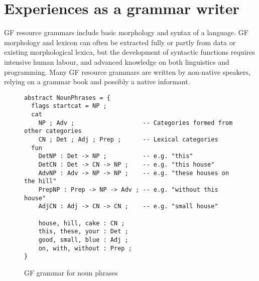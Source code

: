 \documentclass[11pt]{article}
\begin{document}
\section{Experiences as a grammar writer}


GF resource grammars include basic morphology and syntax of a language. GF morphology and lexicon can often be extracted fully or partly from data or existing morphological lexica, but the development of syntactic functions requires intensive human labour, and advanced knowledge on both linguistics and programming.
Many GF resource grammars are written by non-native speakers, relying on a grammar book and possibly a native informant.






\begin{figure}[h]
  \centering
    \begin{verbatim}
abstract NounPhrases = {
  flags startcat = NP ;
  cat
    NP ; Adv ;                   -- Categories formed from other categories
    CN ; Det ; Adj ; Prep ;      -- Lexical categories
  fun
    DetNP : Det -> NP ;          -- e.g. "this"
    DetCN : Det -> CN -> NP ;    -- e.g. "this house"
    AdvNP : Adv -> NP -> NP ;    -- e.g. "these houses on the hill"
    PrepNP : Prep -> NP -> Adv ; -- e.g. "without this house"
    AdjCN : Adj -> CN -> CN ;    -- e.g. "small house"

    house, hill, cake : CN ;
    this, these, your : Det ;
    good, small, blue : Adj ;
    on, with, without : Prep ;
}\end{verbatim}
  \caption{GF grammar for noun phrases}
\label{fig:exampleGrammar}
\end{figure}
\end{document}
